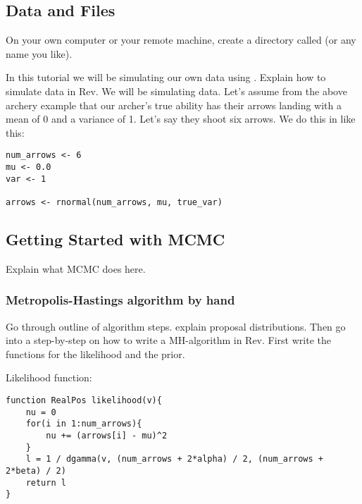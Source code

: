 \medskip
\subsection{Data and Files}\label{subsect:Exercise-DataFiles}

{\begin{framed}
On your own computer or your remote machine, create a directory called {\textcolor{red}{}} (or any name you like).

\end{framed}}

In this tutorial we will be simulating our own data using \RevBayes. Explain how to simulate data in Rev. We will be simulating data. Let's assume from the above archery example that our archer's true ability has their arrows landing with a mean of 0 and a variance of 1. Let's say they shoot six arrows. We do this in \RevBayes like this:

 {\tt \begin{snugshade*}
\begin{lstlisting}
num_arrows <- 6
mu <- 0.0
var <- 1

arrows <- rnormal(num_arrows, mu, true_var)

\end{lstlisting}
\end{snugshade*}}



\bigskip
\subsection{Getting Started with MCMC\label{subsect:Exercise-GetStart}}

Explain what MCMC does here.

\subsubsection{Metropolis-Hastings algorithm by hand}

Go through outline of algorithm steps. explain proposal distributions. Then go into a step-by-step on how to write a MH-algorithm in Rev. First write the functions for the likelihood and the prior. 

Likelihood function:

 {\tt \begin{snugshade*}
\begin{lstlisting}
function RealPos likelihood(v){
	nu = 0
	for(i in 1:num_arrows){
		nu += (arrows[i] - mu)^2
	}
	l = 1 / dgamma(v, (num_arrows + 2*alpha) / 2, (num_arrows + 2*beta) / 2)
	return l
}

\end{lstlisting}
\end{snugshade*}}

